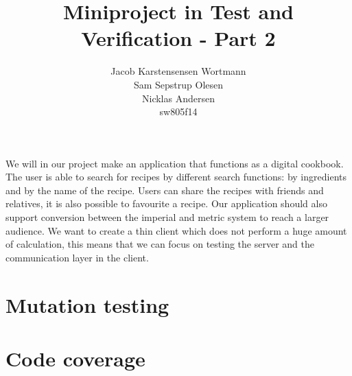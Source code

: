 \documentclass[a4paper,12pt]{memoir}
\title{Miniproject in Test and Verification - Part 2}
\author{Jacob Karstensensen Wortmann\\Sam Sepstrup Olesen\\Nicklas Andersen\\sw805f14}
\begin{document}
\maketitle %
We will in our project make an application that functions as a digital cookbook. The user is able to search for recipes by different search functions: by ingredients and by the name of the recipe. Users can share the recipes with friends and relatives, it is also possible to favourite a recipe. Our application should also support conversion between the imperial and metric system to reach a larger audience. 
We want to create a thin client which does not perform a huge amount of calculation, this means that we can focus on testing the server and the communication layer in the client.

\section{Mutation testing}
\section{Code coverage}
\end{document}
